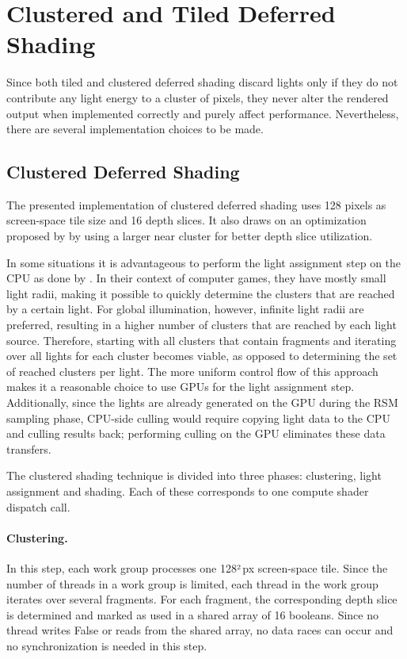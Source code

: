 \section{Clustered and Tiled Deferred Shading}
\label{sec:impl:clusteredShading}

Since both tiled and clustered deferred shading discard lights only if they do not contribute any light energy to a cluster of pixels, they never alter the rendered output when implemented correctly and purely affect performance. Nevertheless, there are several implementation choices to be made.


\subsection{Clustered Deferred Shading}

The presented implementation of clustered deferred shading uses 128 pixels as screen-space tile size and 16 depth slices. It also draws on an optimization proposed by \citet{persson::2013::practical} by using a larger near cluster for better depth slice utilization.

In some situations it is advantageous to perform the light assignment step on the CPU as done by \citet{persson::2013::practical}. In their context of computer games, they have mostly small light radii, making it possible to quickly determine the clusters that are reached by a certain light. For global illumination, however, infinite light radii are preferred, resulting in a higher number of clusters that are reached by each light source. Therefore, starting with all clusters that contain fragments and iterating over all lights for each cluster becomes viable, as opposed to determining the set of reached clusters per light. The more uniform control flow of this approach makes it a reasonable choice to use GPUs for the light assignment step. Additionally, since the lights are already generated on the GPU during the RSM sampling phase, CPU-side culling would require copying light data to the CPU and culling results back; performing culling on the GPU eliminates these data transfers.


The clustered shading technique is divided into three phases: clustering, light assignment and shading. Each of these corresponds to one compute shader dispatch call.

\paragraph{Clustering.}
In this step, each work group processes one 128²\,px screen-space tile. Since the number of threads in a work group is limited, each thread in the work group iterates over several fragments. For each fragment, the corresponding depth slice is determined and marked as used in a shared array of 16 booleans. Since no thread writes False or reads from the shared array, no data races can occur and no synchronization is needed in this step.

